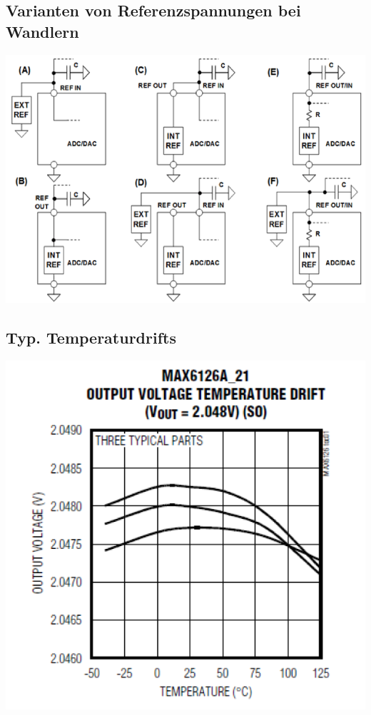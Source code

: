 \vspace*{0.1cm}\begin{minipage}[t]{12cm}
	\subsection{Varianten von Referenzspannungen bei Wandlern}
		\includegraphics[scale=0.3]{pictures/variantenReferenzspannungen}
\end{minipage}
\begin{minipage}[t]{6cm}
	\subsection{Typ. Temperaturdrifts}
		 \includegraphics[scale=0.3]{pictures/typTempDrift.png}
\end{minipage}
